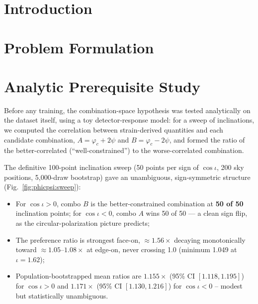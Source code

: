 \documentclass[11pt]{article}
\begin{document}
\tableofcontents

\section{Introduction}
\label{sec:phicpsi:intro}


\section{Problem Formulation}
\label{sec:phicpsi:problem}


\section{Analytic Prerequisite Study}
\label{sec:phicpsi:prereq}

Before any training, the combination-space hypothesis was tested analytically on the dataset itself, using a toy detector-response model: for a sweep of inclinations, we computed the correlation between strain-derived quantities and each candidate combination, $A = \varphi_c + 2\psi$ and $B = \varphi_c - 2\psi$, and formed the ratio of the better-correlated (``well-constrained'') to the worse-correlated combination.

The definitive 100-point inclination sweep (50 points per sign of $\cos\iota$, 200 sky positions, 5{,}000-draw bootstrap) gave an unambiguous, sign-symmetric structure (Fig.~\ref{fig:phicpsi:sweep}):
\begin{itemize}
\item For $\cos\iota > 0$, combo $B$ is the better-constrained combination at \textbf{50 of 50} inclination points; for $\cos\iota < 0$, combo $A$ wins 50 of 50 --- a clean sign flip, as the circular-polarization picture predicts;
\item The preference ratio is strongest face-on, $\approx 1.56\times$ decaying monotonically toward $\approx 1.05$--$1.08\times$ at edge-on, never crossing 1.0 (minimum 1.049 at $\iota = 1.62$);
\item Population-bootstrapped mean ratios are $1.155\times$ (95\% CI $[1.118, 1.195]$) for $\cos\iota > 0$ and $1.171\times$ (95\% CI $[1.130, 1.216]$) for $\cos\iota < 0$ – modest but statistically unambiguous.
\end{itemize}
\end{document}
